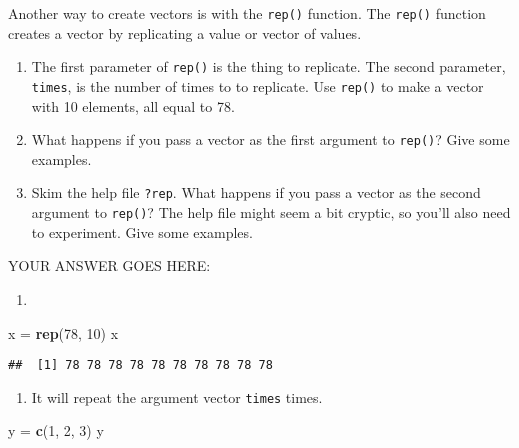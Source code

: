 \documentclass[
]{article}
\newenvironment{Shaded}{\begin{snugshade}}{\end{snugshade}}
\newcommand{\DecValTok}[1]{\textcolor[rgb]{0.00,0.00,0.81}{#1}}
\newcommand{\KeywordTok}[1]{\textcolor[rgb]{0.13,0.29,0.53}{\textbf{#1}}}
\newcommand{\NormalTok}[1]{#1}
\newcommand{\StringTok}[1]{\textcolor[rgb]{0.31,0.60,0.02}{#1}}
\providecommand{\tightlist}{%
  \setlength{\itemsep}{0pt}\setlength{\parskip}{0pt}}
\begin{document}
Another way to create vectors is with the \texttt{rep()} function. The
\texttt{rep()} function creates a vector by replicating a value or
vector of values.

\begin{enumerate}
\def\labelenumi{\arabic{enumi}.}
\item
  The first parameter of \texttt{rep()} is the thing to replicate. The
  second parameter, \texttt{times}, is the number of times to to
  replicate. Use \texttt{rep()} to make a vector with 10 elements, all
  equal to 78.
\item
  What happens if you pass a vector as the first argument to
  \texttt{rep()}? Give some examples.
\item
  Skim the help file \texttt{?rep}. What happens if you pass a vector as
  the second argument to \texttt{rep()}? The help file might seem a bit
  cryptic, so you'll also need to experiment. Give some examples.
\end{enumerate}

YOUR ANSWER GOES HERE:

\begin{enumerate}
\def\labelenumi{\arabic{enumi}.}
\tightlist
\item
\end{enumerate}

\begin{Shaded}
\begin{Highlighting}[]
\NormalTok{x =}\StringTok{ }\KeywordTok{rep}\NormalTok{(}\DecValTok{78}\NormalTok{, }\DecValTok{10}\NormalTok{)}
\NormalTok{x}
\end{Highlighting}
\end{Shaded}

\begin{verbatim}
##  [1] 78 78 78 78 78 78 78 78 78 78
\end{verbatim}

\begin{enumerate}
\def\labelenumi{\arabic{enumi}.}
\setcounter{enumi}{1}
\tightlist
\item
  It will repeat the argument vector \texttt{times} times.
\end{enumerate}

\begin{Shaded}
\begin{Highlighting}[]
\NormalTok{y =}\StringTok{ }\KeywordTok{c}\NormalTok{(}\DecValTok{1}\NormalTok{, }\DecValTok{2}\NormalTok{, }\DecValTok{3}\NormalTok{)}
\NormalTok{y}
\end{Highlighting}
\end{Shaded}
\end{document}
